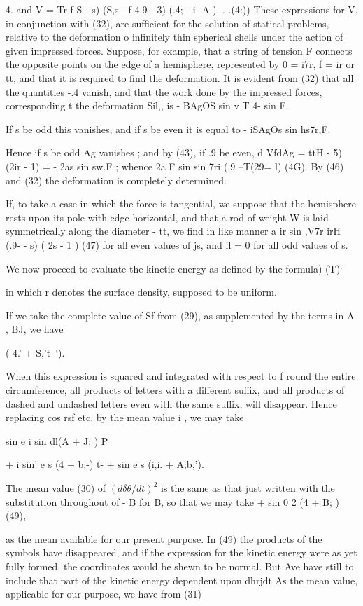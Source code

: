 4.  and V = Tr f S - s) (S,s- -f 4.9 - 3) (.4;- -i- A ). . .(4:)) These
expressions for V, in conjunction with (32), are sufficient for the solution
of statical problems, relative to the deformation o infinitely thin spherical
shells under the action of given impressed forces. Suppose, for example, that a
string of tension F connects the opposite points on the edge of a hemisphere,
represented by 0 = i7r, f = ir or tt, and that it is required to find the
deformation. It is evident from (32) that all the quantities -.4 vanish, and
that the work done by the impressed forces, corresponding t the deformation
Sil,, is
- BAgOS sin v T 4- sin F.

If s be odd this vanishes, and if s be even it is equal to
- iSAgOs sin hs7r,F.

Hence if s be odd Ag vanishes ; and by (43), if .9 be even, d VfdAg = ttH - 5)
(2ir - 1) = - 2as sin sw.F ; whence 2a F sin  sin 7ri (,9 --T(29=  l) (4G).
By (46) and (32) the deformation is completely determined.

If, to take a case in which the force is tangential, we suppose that the
hemisphere rests upon its pole with edge horizontal, and that a rod of weight W
is laid symmetrically along the diameter - tt, we find in like manner
a ir sin ,V7r irH (.9- - s) ( 2s - 1 ) (47) for all even values of js, and il = 0 for
all odd values of s.

We now proceed to evaluate the kinetic energy as defined by the formula) (T)‘

in which r denotes the surface density, supposed to be uniform.

If we take the complete value of Sf from (29), as supplemented by the terms in
A , BJ, we have

 (-4.'  + S,'t~‘).

When this expression is squared and integrated with respect to f round the
entire circumference, all products of letters with a different suffix, and all
products of dashed and undashed letters even with the same suffix, will
disappear. Hence replacing cos rsf etc. by the mean value i , we may take

sin e i sin dl(A + J; ) P

+ i sin' e s (4 + b;-) t- + sin e s (i,i. + A;b,').

The mean value (30) of
\(
(d \delta \theta/dt)^2
\)
is the same as that just written with the
substitution throughout of - B for B, so that we may take + sin  0 2 (4 + B; )
(49),

as the mean available for our present purpose. In (49) the products of the
symbols have disappeared, and if the expression for the kinetic energy were as
yet fully formed, the coordinates would be shewn to be normal.  But Ave have
still to include that part of the kinetic energy dependent upon dhrjdt As the
mean value, applicable for our purpose, we have from (31)

